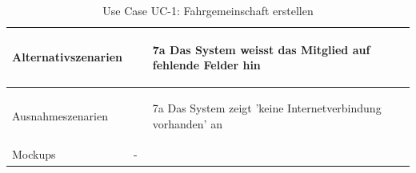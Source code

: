 \begin{table}[ht]
\begin{tabular}{ l | p{10cm} }
					\\ \hline
	Alternativszenarien	&	\begin{enumerate}
					\item[7a] Das System weisst das Mitglied auf fehlende Felder hin
					\end{enumerate}
					\\ \hline
	Ausnahmeszenarien&	\begin{enumerate}
					\item[7a] Das System zeigt 'keine Internetverbindung vorhanden' an
					\end{enumerate}
					\\ \hline
	Mockups	 	&	-
  \end{tabular}
   \caption{Use Case UC-1: Fahrgemeinschaft erstellen}\label{table:use_case_1}
\end{table}

